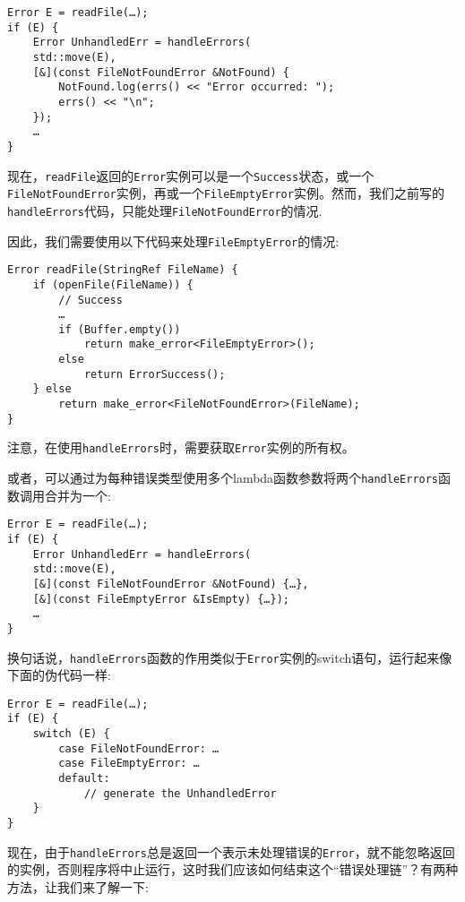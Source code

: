 \begin{lstlisting}[style=styleCXX]
Error E = readFile(…);
if (E) {
	Error UnhandledErr = handleErrors(
	std::move(E),
	[&](const FileNotFoundError &NotFound) {
		NotFound.log(errs() << "Error occurred: ");
		errs() << "\n";
	});
	…
}
\end{lstlisting}

现在，\texttt{readFile}返回的\texttt{Error}实例可以是一个\texttt{Success}状态，或一个\texttt{FileNotFoundError}实例，再或一个\texttt{FileEmptyError}实例。然而，我们之前写的\texttt{handleErrors}代码，只能处理\texttt{FileNotFoundError}的情况.

因此，我们需要使用以下代码来处理\texttt{FileEmptyError}的情况:

\begin{lstlisting}[style=styleCXX]
Error readFile(StringRef FileName) {
	if (openFile(FileName)) {
		// Success
		…
		if (Buffer.empty())
			return make_error<FileEmptyError>();
		else
			return ErrorSuccess();
	} else
		return make_error<FileNotFoundError>(FileName);
}
\end{lstlisting}

注意，在使用\texttt{handleErrors}时，需要获取\texttt{Error}实例的所有权。

或者，可以通过为每种错误类型使用多个lambda函数参数将两个\texttt{handleErrors}函数调用合并为一个:

\begin{lstlisting}[style=styleCXX]
Error E = readFile(…);
if (E) {
	Error UnhandledErr = handleErrors(
	std::move(E),
	[&](const FileNotFoundError &NotFound) {…},
	[&](const FileEmptyError &IsEmpty) {…});
	…
}
\end{lstlisting}

换句话说，\texttt{handleErrors}函数的作用类似于\texttt{Error}实例的switch语句，运行起来像下面的伪代码一样:

\begin{lstlisting}[style=styleCXX]
Error E = readFile(…);
if (E) {
	switch (E) {
		case FileNotFoundError: …
		case FileEmptyError: …
		default:
			// generate the UnhandledError
	}
}
\end{lstlisting}

现在，由于\texttt{handleErrors}总是返回一个表示未处理错误的\texttt{Error}，就不能忽略返回的实例，否则程序将中止运行，这时我们应该如何结束这个“错误处理链”？有两种方法，让我们来了解一下:

